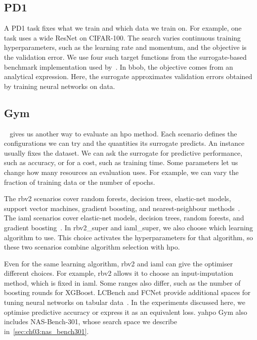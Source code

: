 \subsection{PD1}
\label{sec:ch03:pd1}

A PD1 task fixes what we train and which data we train on. For example, one task uses a wide ResNet on CIFAR-100. The search varies continuous training hyperparameters, such as the learning rate and momentum, and the objective is the validation error. We use four such target functions from the surrogate-based benchmark implementation used by~\citet{MalEtAl23}. In \gls{bbob}, the objective comes from an analytical expression. Here, the surrogate approximates validation errors obtained by training neural networks on data.

\subsection{ Gym}
\label{sec:ch03:hpo_benchmarks}

~\citep{PfiEtAl22} gives us another way to evaluate an \gls{hpo} method. Each scenario defines the configurations we can try and the quantities its surrogate predicts. An instance usually fixes the dataset. We can ask the surrogate for predictive performance, such as accuracy, or for a cost, such as training time. Some parameters let us change how many resources an evaluation uses. For example, we can vary the fraction of training data or the number of epochs.

The rbv2 scenarios cover random forests, decision trees, elastic-net models, support vector machines, gradient boosting, and nearest-neighbour methods~\citep{BinEtAl20}. The iaml scenarios cover elastic-net models, decision trees, random forests, and gradient boosting~\citep{PfiEtAl22}. In rbv2\_super and iaml\_super, we also choose which learning algorithm to use. This choice activates the hyperparameters for that algorithm, so these two scenarios combine algorithm selection with \gls{hpo}.

Even for the same learning algorithm, rbv2 and iaml can give the optimiser different choices. For example, rbv2 allows it to choose an input-imputation method, which is fixed in iaml. Some ranges also differ, such as the number of boosting rounds for XGBoost. LCBench and FCNet provide additional spaces for tuning neural networks on tabular data~\citep{ZimEtAl21b,FalEtAl18}. In the experiments discussed here, we optimise predictive accuracy or express it as an equivalent loss. \Gls{yahpo} Gym also includes NAS-Bench-301, whose search space we describe in~\cref{sec:ch03:nas_bench301}.

